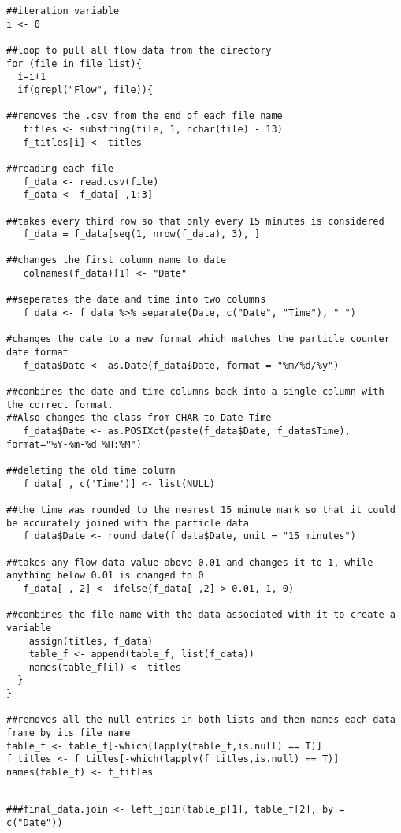 \documentclass[
]{article}
\begin{document}
\begin{verbatim}
##iteration variable
i <- 0

##loop to pull all flow data from the directory
for (file in file_list){
  i=i+1
  if(grepl("Flow", file)){
    
##removes the .csv from the end of each file name
   titles <- substring(file, 1, nchar(file) - 13)
   f_titles[i] <- titles
   
##reading each file
   f_data <- read.csv(file)
   f_data <- f_data[ ,1:3]
   
##takes every third row so that only every 15 minutes is considered
   f_data = f_data[seq(1, nrow(f_data), 3), ]
   
##changes the first column name to date
   colnames(f_data)[1] <- "Date"
   
##seperates the date and time into two columns
   f_data <- f_data %>% separate(Date, c("Date", "Time"), " ")
   
#changes the date to a new format which matches the particle counter date format
   f_data$Date <- as.Date(f_data$Date, format = "%m/%d/%y")
   
##combines the date and time columns back into a single column with the correct format. 
##Also changes the class from CHAR to Date-Time
   f_data$Date <- as.POSIXct(paste(f_data$Date, f_data$Time), format="%Y-%m-%d %H:%M")
   
##deleting the old time column
   f_data[ , c('Time')] <- list(NULL)
   
##the time was rounded to the nearest 15 minute mark so that it could be accurately joined with the particle data
   f_data$Date <- round_date(f_data$Date, unit = "15 minutes")
   
##takes any flow data value above 0.01 and changes it to 1, while anything below 0.01 is changed to 0
   f_data[ , 2] <- ifelse(f_data[ ,2] > 0.01, 1, 0)
   
##combines the file name with the data associated with it to create a variable
    assign(titles, f_data)
    table_f <- append(table_f, list(f_data))
    names(table_f[i]) <- titles
  }
}

##removes all the null entries in both lists and then names each data frame by its file name
table_f <- table_f[-which(lapply(table_f,is.null) == T)]
f_titles <- f_titles[-which(lapply(f_titles,is.null) == T)]
names(table_f) <- f_titles
\end{verbatim}

\begin{verbatim}
                                                                                   
###final_data.join <- left_join(table_p[1], table_f[2], by = c("Date"))
\end{verbatim}
\end{document}
